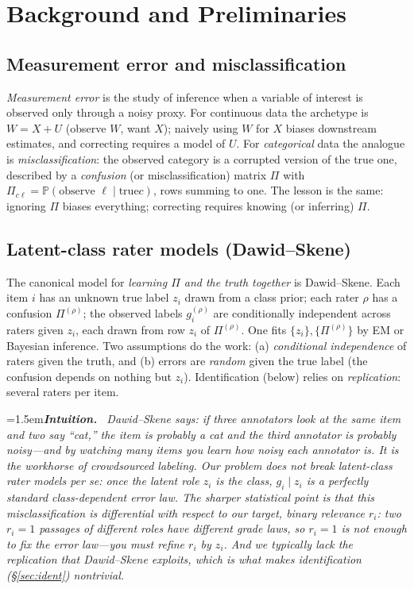 \documentclass[11pt]{article}
\newenvironment{intuition}{\par\smallskip\noindent\hangindent=1.5em\textbf{\itshape Intuition.}\itshape\ \ignorespaces}{\par\smallskip}
\renewcommand{\Pr}{\mathbb{P}}
\begin{document}
\section{Background and Preliminaries}\label{sec:prelim}
\subsection{Measurement error and misclassification}
\emph{Measurement error} is the study of inference when a variable of interest is observed only through a noisy
proxy. For continuous data the archetype is $W=X+U$ (observe $W$, want $X$); naively using $W$ for $X$ biases
downstream estimates, and correcting requires a model of $U$. For \emph{categorical} data the analogue is
\emph{misclassification}: the observed category is a corrupted version of the true one, described by a
\emph{confusion} (or misclassification) matrix $\Pi$ with $\Pi_{c\ell}=\Pr(\text{observe }\ell\mid\text{true
}c)$, rows summing to one. The lesson is the same: ignoring $\Pi$ biases everything; correcting requires
knowing (or inferring) $\Pi$.

\subsection{Latent-class rater models (Dawid--Skene)}
The canonical model for \emph{learning $\Pi$ and the truth together} is Dawid--Skene. Each item $i$ has an
unknown true label $z_i$ drawn from a class prior; each rater $\rho$ has a confusion $\Pi^{(\rho)}$; the observed
labels $g_i^{(\rho)}$ are conditionally independent across raters given $z_i$, each drawn from row $z_i$ of
$\Pi^{(\rho)}$. One fits $\{z_i\},\{\Pi^{(\rho)}\}$ by EM or Bayesian inference. Two assumptions do the work:
(a) \emph{conditional independence} of raters given the truth, and (b) errors are \emph{random} given the true
label (the confusion depends on nothing but $z_i$). Identification (below) relies on \emph{replication}: several
raters per item.
\begin{intuition}
Dawid--Skene says: if three annotators look at the same item and two say ``cat,'' the item is probably a cat and
the third annotator is probably noisy---and by watching many items you learn \emph{how} noisy each annotator is.
It is the workhorse of crowdsourced labeling. Our problem does \emph{not} break latent-class rater models per
se: once the latent \emph{role} $z_i$ is the class, $g_i\mid z_i$ is a perfectly standard class-dependent error
law. The sharper statistical point is that this misclassification is \emph{differential} with respect to our
target, binary relevance $r_i$: two $r_i{=}1$ passages of different roles have different grade laws, so $r_i{=}1$
is not enough to fix the error law---you must refine $r_i$ by $z_i$. And we typically lack the replication that
Dawid--Skene exploits, which is what makes identification (\S\ref{sec:ident}) nontrivial.
\end{intuition}
\end{document}
